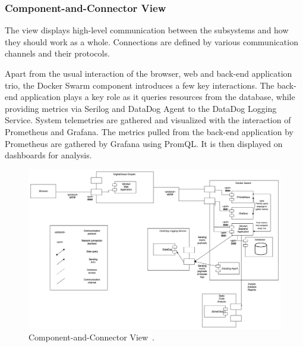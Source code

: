 \newpage
\subsubsection*{Component-and-Connector View}

The view displays high-level communication between the subsystems and how they should work as a whole. Connections are defined by various communication channels and their protocols.
\vspace{3mm}

Apart from the usual interaction of the browser, web and back-end application trio, the Docker Swarm component introduces a few key interactions. The back-end application plays a key role as it queries resources from the database, while providing metrics via Serilog and DataDog Agent to the DataDog Logging Service. System telemetries are gathered and visualized with the interaction of Prometheus and Grafana. The metrics pulled from the back-end application by Prometheus are gathered by Grafana using PromQL. It is then displayed on dashboards for analysis.
\vspace{3mm}

\begin{figure}[h!]
    \centering
    \includegraphics[width=\linewidth,height=\textheight,keepaspectratio]{images/architectural_views/minitwit_cc_view.png}
    \caption{Component-and-Connector View~\cite{componentAndConnectorView}.}
    \label{fig:ccview}
\end{figure}